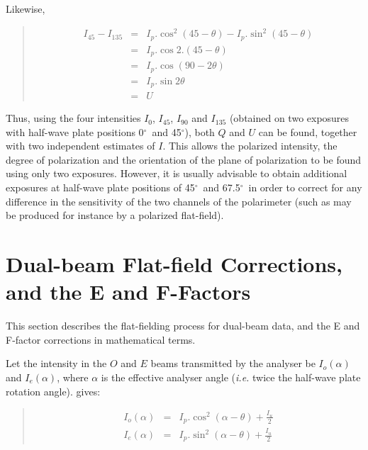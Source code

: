 \documentclass[twoside,11pt]{starlink}
\newenvironment{myquote}{\begin{quote}\begin{small}}{\end{small}\end{quote}}
\providecommand{\dgs}{\hbox{$^\circ$}}
\begin{document}
Likewise,
\begin{myquote}
\begin{eqnarray*}
  I_{45} - I_{135} & = & I_{p}.\cos^{2}(45 - \theta) - I_{p}.\sin^{2}(45 - \theta) \\
                   & = & I_{p}.\cos 2.(45 - \theta) \\
                   & = & I_{p}.\cos (90 - 2\theta) \\
                   & = & I_{p}.\sin 2\theta \\
                   & = & U
\end{eqnarray*}
\end{myquote}

Thus, using the four intensities $I_{0}$, $I_{45}$, $I_{90}$ and $I_{135}$
(obtained on two exposures with half-wave plate positions 0\dgs\ and
45\dgs), both $Q$ and $U$ can be found, together with two
independent estimates of $I$. This allows the polarized intensity, the
degree of polarization and the orientation of the plane of polarization to
be found using only two exposures. However, it is usually advisable to
obtain additional exposures at half-wave plate positions of 45\dgs\ and
67.5\dgs\ in order to correct for any difference in the sensitivity of
the two channels of the polarimeter (such as may be produced for instance
by a polarized flat-field).

\newpage
\section{\label{APP:FFCOR}Dual-beam
Flat-field Corrections, and the E and F-Factors}
This section describes the flat-fielding process for dual-beam data, and the
E and F-factor corrections in mathematical terms.

Let the intensity in the $O$ and $E$ beams transmitted by the analyser be
$I_{o}(\alpha)$ and $I_{e}(\alpha)$, where $\alpha$ is the effective
analyser angle (\emph{i.e.} twice the half-wave plate rotation angle).
 gives:

\begin{myquote}
\begin{eqnarray*}
  I_{o}(\alpha) & = & I_{p}.\cos^{2}( \alpha - \theta ) + \frac{I_{u}}{2} \\
  I_{e}(\alpha) & = & I_{p}.\sin^{2}( \alpha - \theta ) + \frac{I_{u}}{2}
\end{eqnarray*}
\end{myquote}
\end{document}
